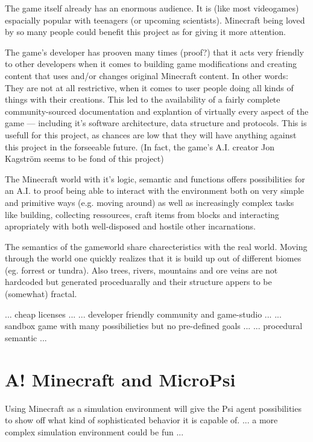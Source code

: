 The game itself already has an enormous audience. It is (like most videogames) espacially popular with teenagers (or upcoming scientists). Minecraft being loved by so many people could benefit this project as for giving it more attention.

The game's developer has prooven many times (proof?) that it acts very friendly to other developers when it comes to building game modifications and creating content that uses and/or changes original Minecraft content. In other words: They are not at all restrictive, when it comes to user people doing all kinds of things with their creations. This led to the availability of a fairly complete community-sourced  documentation and explantion of virtually every aspect of the game --- including it's software architecture, data structure and protocols. This is usefull for this project, as chances are low that they will have anything against this project in the forseeable future. (In fact, the game's A.I. creator Jon Kagström seems to be fond of this project)

The Minecraft world with it's logic, semantic and functions offers possibilities for an A.I. to proof being able to interact with the environment both on very simple and primitive ways (e.g. moving around) as well as increasingly complex tasks like building, collecting ressources, craft items from blocks and interacting apropriately with both well-disposed and hostile other incarnations. %

The semantics of the gameworld share charecteristics with the real world. Moving through the world one quickly realizes that it is build up out of different biomes (eg. forrest or tundra). Also trees, rivers, mountains and ore veins are not hardcoded but generated proceduarally and their structure appers to be (somewhat) fractal.
        
... cheap licenses ...
... developer friendly community and game-studio ...
... sandbox game with many possibilieties but no pre-defined goals ...
... procedural semantic ...

    \section{A! Minecraft and MicroPsi}
Using Minecraft as a simulation environment will give the Psi agent possibilities to show off what kind of sophisticated behavior it is capable of.
... a more complex simulation environment could be fun ...